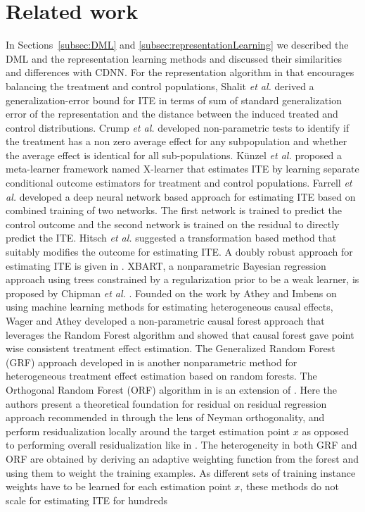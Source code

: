 \documentclass[sigconf]{acmart}
\newcommand{\eat}[1]{}
\theoremstyle{plain}
\numberwithin{equation}{section}
\begin{document}
\eat{
\textbf{Other advantages} of CDNN include ability to warm-start from previous models, ability to be used for forecasting incremental impact at unit level, etc.}
\section{Related work}
\label{sec:related}
In Sections~\ref{subsec:DML} and \ref{subsec:representationLearning} we described the DML and the representation learning methods and discussed their similarities and differences with CDNN. For the representation algorithm in \cite{blrJohansson} that encourages balancing the treatment and control populations, Shalit {\it et al.} \cite{dnnShalit} derived a generalization-error bound for ITE in terms of sum of standard generalization error of the representation and the distance between the induced treated and control distributions. Crump {\it et al.} \cite{knnCrump} developed non-parametric tests to identify if the treatment has a non zero average effect for any subpopulation and whether the average effect is identical for all sub-populations. K{\"u}nzel {\it et al.} \cite{XLearner} proposed a meta-learner framework named X-learner that estimates ITE by learning separate conditional outcome estimators for treatment and control populations. Farrell  {\it et al.}  \cite{JointLearnDNN} developed a deep neural network based approach for estimating ITE based on combined training of two networks. The first network is trained to predict the control outcome and the second network is trained on the residual to directly predict the ITE. Hitsch  {\it et al.} \cite{OutcomeTransformITE} suggested a transformation based method that suitably modifies the outcome for estimating ITE. A doubly robust approach for estimating ITE is given in \cite{DRITE}. XBART, a nonparametric Bayesian regression approach using trees constrained by a regularization prior to be a weak learner, is proposed by Chipman {\it et al.} \cite{bartChipman}. Founded on the work by Athey and Imbens \cite{guidoMLmethods} on using machine learning methods for estimating heterogeneous causal effects,  Wager and Athey \cite{causalForest} developed a non-parametric causal forest approach that leverages the Random Forest \cite{randomForest} algorithm and showed that causal forest gave point wise consistent treatment effect estimation. The Generalized Random Forest (GRF) approach developed in \cite{GRF} is another nonparametric method for heterogeneous treatment effect estimation based on random forests. The Orthogonal Random Forest (ORF) algorithm in \cite{OrthogonalRandomForest} is an extension of \cite{GRF}. Here the authors present a theoretical foundation for residual on residual regression approach recommended in \cite{GRF} through the lens of Neyman orthogonality, and perform residualization locally around the target estimation point $x$ as opposed to performing overall residualization like in \cite{GRF}. The heterogeneity in both GRF and ORF are obtained by deriving an adaptive weighting function from the forest and using them to weight the training examples. As different sets of training instance weights have to be learned for each estimation point $x$, these methods do not scale for estimating ITE for hundreds 
\end{document}
